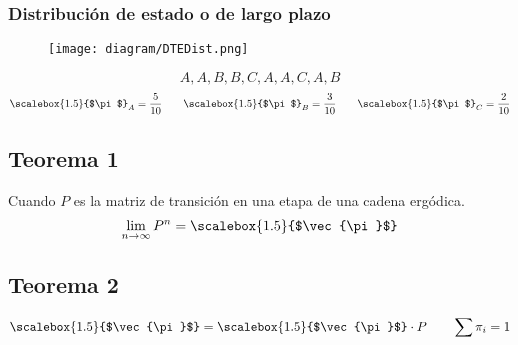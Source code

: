 \documentclass{templateNote}
\begin{document}
\subsubsection{Distribución de estado o de largo plazo}
\begin{minipage}{0.45\textwidth}
    \begin{figure}[H]
        \centering
        \texttt{[image: diagram/DTEDist.png]}
    \end{figure}
\end{minipage}
\hfill
\begin{minipage}[ht]{0.45\textwidth}
    \begin{equation*}
        A, A, B, B, C, A, A, C, A, B
    \end{equation*}
    \begin{equation*}
        \scalebox{1.5}{$\pi$}_A = \frac{5}{10} \qquad \scalebox{1.5}{$\pi$}_B = \frac{3}{10} \qquad \scalebox{1.5}{$\pi$}_C = \frac{2}{10}
    \end{equation*}
\end{minipage}

\subsection{Teorema 1}
Cuando $P$ es la matriz de transición en una etapa de una cadena ergódica.
\begin{equation*}
    \lim_{n \to \infty}{P^n} = \scalebox{1.5}{$\vec{\pi}$}
\end{equation*}

\subsection{Teorema 2}
\begin{equation*}
    \scalebox{1.5}{$\vec{\pi}$} = \scalebox{1.5}{$\vec{\pi}$} \cdot P \qquad \sum{\pi_i} = 1
\end{equation*}
\end{document}
